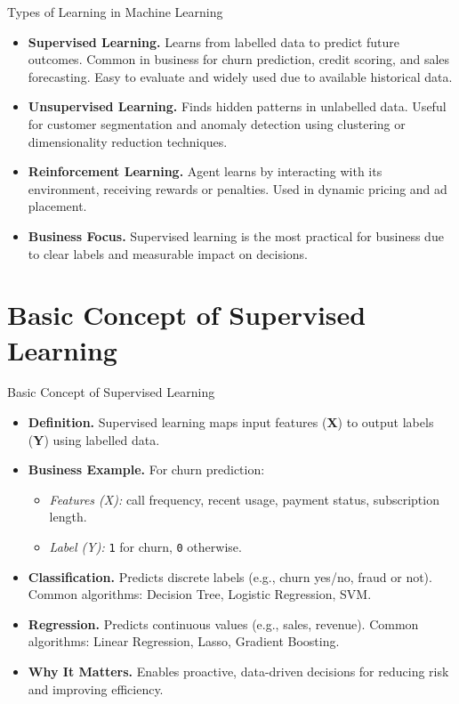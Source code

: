 \documentclass[aspectratio=169, table]{beamer}
\begin{document}
\begin{frame}{Types of Learning in Machine Learning}
	\vspace{20pt}
	\begin{itemize}
		\item \textbf{Supervised Learning.} Learns from labelled data to predict future outcomes. Common in business for churn prediction, credit scoring, and sales forecasting. Easy to evaluate and widely used due to available historical data.
		
		\item \textbf{Unsupervised Learning.} Finds hidden patterns in unlabelled data. Useful for customer segmentation and anomaly detection using clustering or dimensionality reduction techniques.
		
		\item \textbf{Reinforcement Learning.} Agent learns by interacting with its environment, receiving rewards or penalties. Used in dynamic pricing and ad placement.
		
		\item \textbf{Business Focus.} Supervised learning is the most practical for business due to clear labels and measurable impact on decisions.
	\end{itemize}
\end{frame}

\section{Basic Concept of Supervised Learning}

\begin{frame}{Basic Concept of Supervised Learning}
	\vspace{20pt}
	\begin{itemize}
		\item \textbf{Definition.} Supervised learning maps input features (\textbf{X}) to output labels (\textbf{Y}) using labelled data.
		\item \textbf{Business Example.} For churn prediction:
		\begin{itemize}
			\item \textit{Features (X):} call frequency, recent usage, payment status, subscription length.
			\item \textit{Label (Y):} \texttt{1} for churn, \texttt{0} otherwise.
		\end{itemize}
		\item \textbf{Classification.} Predicts discrete labels (e.g., churn yes/no, fraud or not). Common algorithms: Decision Tree, Logistic Regression, SVM.
		\item \textbf{Regression.} Predicts continuous values (e.g., sales, revenue). Common algorithms: Linear Regression, Lasso, Gradient Boosting.
		\item \textbf{Why It Matters.} Enables proactive, data-driven decisions for reducing risk and improving efficiency.
	\end{itemize}
\end{frame}
\end{document}
